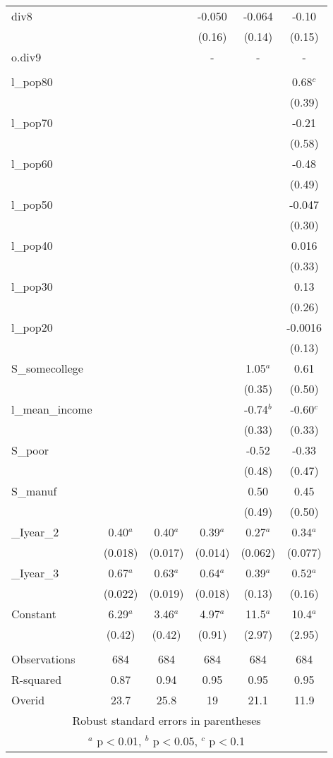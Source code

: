 \documentclass[]{article}
\begin{document}
\begin{tabular}{lccccc}
div8 &  &  & -0.050 & -0.064 & -0.10 \\
 &  &  & (0.16) & (0.14) & (0.15) \\
o.div9 &  &  & - & - & - \\
 &  &  &  &  &  \\
l\_pop80 &  &  &  &  & 0.68$^c$ \\
 &  &  &  &  & (0.39) \\
l\_pop70 &  &  &  &  & -0.21 \\
 &  &  &  &  & (0.58) \\
l\_pop60 &  &  &  &  & -0.48 \\
 &  &  &  &  & (0.49) \\
l\_pop50 &  &  &  &  & -0.047 \\
 &  &  &  &  & (0.30) \\
l\_pop40 &  &  &  &  & 0.016 \\
 &  &  &  &  & (0.33) \\
l\_pop30 &  &  &  &  & 0.13 \\
 &  &  &  &  & (0.26) \\
l\_pop20 &  &  &  &  & -0.0016 \\
 &  &  &  &  & (0.13) \\
S\_somecollege &  &  &  & 1.05$^a$ & 0.61 \\
 &  &  &  & (0.35) & (0.50) \\
l\_mean\_income &  &  &  & -0.74$^b$ & -0.60$^c$ \\
 &  &  &  & (0.33) & (0.33) \\
S\_poor &  &  &  & -0.52 & -0.33 \\
 &  &  &  & (0.48) & (0.47) \\
S\_manuf &  &  &  & 0.50 & 0.45 \\
 &  &  &  & (0.49) & (0.50) \\
\_Iyear\_2 & 0.40$^a$ & 0.40$^a$ & 0.39$^a$ & 0.27$^a$ & 0.34$^a$ \\
 & (0.018) & (0.017) & (0.014) & (0.062) & (0.077) \\
\_Iyear\_3 & 0.67$^a$ & 0.63$^a$ & 0.64$^a$ & 0.39$^a$ & 0.52$^a$ \\
 & (0.022) & (0.019) & (0.018) & (0.13) & (0.16) \\
Constant & 6.29$^a$ & 3.46$^a$ & 4.97$^a$ & 11.5$^a$ & 10.4$^a$ \\
 & (0.42) & (0.42) & (0.91) & (2.97) & (2.95) \\
 &  &  &  &  &  \\
Observations & 684 & 684 & 684 & 684 & 684 \\
R-squared & 0.87 & 0.94 & 0.95 & 0.95 & 0.95 \\
 Overid & 23.7 & 25.8 & 19 & 21.1 & 11.9 \\ \hline
\multicolumn{6}{c}{ Robust standard errors in parentheses} \\
\multicolumn{6}{c}{ $^a$ p$<$0.01, $^b$ p$<$0.05, $^c$ p$<$0.1} \\
\end{tabular}
\end{document}
